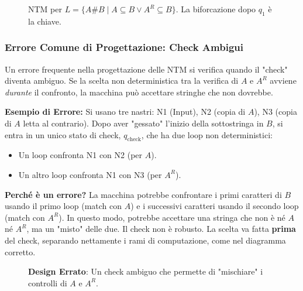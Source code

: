 \documentclass[a4paper]{article}
\begin{document}
\begin{figure}[h!]
{
}
\caption{NTM per $L = \{A\#B \mid A \subseteq B \lor A^R \subseteq B \}$. La biforcazione dopo $q_1$ è la chiave.}
\end{figure}

\subsubsection{Errore Comune di Progettazione: Check Ambigui}
Un errore frequente nella progettazione delle NTM si verifica quando il "check" diventa ambiguo. Se la scelta non deterministica tra la verifica di $A$ e $A^R$ avviene \emph{durante} il confronto, la macchina può accettare stringhe che non dovrebbe.

\textbf{Esempio di Errore:} Si usano tre nastri: N1 (Input), N2 (copia di $A$), N3 (copia di $A$ letta al contrario). Dopo aver "gessato" l'inizio della sottostringa in $B$, si entra in un unico stato di check, $q_{\text{check}}$, che ha due loop non deterministici:
\begin{itemize}
    \item Un loop confronta N1 con N2 (per $A$).
    \item Un altro loop confronta N1 con N3 (per $A^R$).
\end{itemize}
\textbf{Perché è un errore?} La macchina potrebbe confrontare i primi caratteri di $B$ usando il primo loop (match con $A$) e i successivi caratteri usando il secondo loop (match con $A^R$). In questo modo, potrebbe accettare una stringa che non è né $A$ né $A^R$, ma un "misto" delle due. Il check non è robusto. La scelta va fatta \textbf{prima} del check, separando nettamente i rami di computazione, come nel diagramma corretto.

\begin{figure}[h!]
\centering
{}
\caption{\textbf{Design Errato}: Un check ambiguo che permette di "mischiare" i controlli di $A$ e $A^R$.}
\end{figure}
\end{document}
